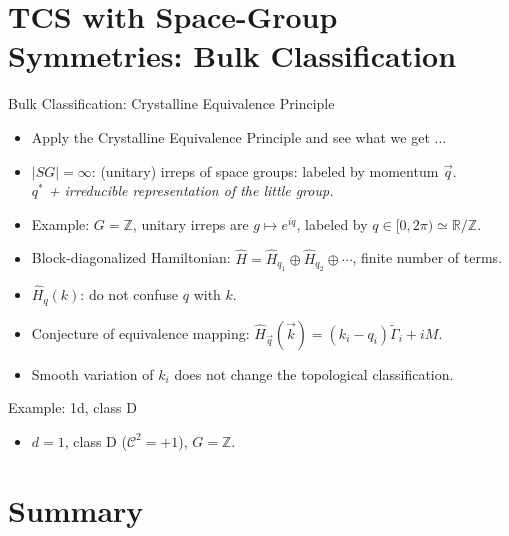 \documentclass[xcolor=table, 11pt, aspectratio=169]{beamer}
\begin{document}
  \section{TCS with Space-Group Symmetries: Bulk Classification}

  \begin{frame}{Bulk Classification: Crystalline Equivalence Principle}
    \begin{itemize}
      \item<1-> Apply the Crystalline Equivalence Principle and see what we get ...
      \item<2-> $|SG|=\infty$: (unitary) irreps of space groups: labeled by momentum $\vec q$.\\
      \emph{$q^\ast$ + irreducible representation of the little group.}
      \item<3-> Example: $G=\mathbb Z$, unitary irreps are $g\mapsto e^{iq}$, labeled by $q\in [0,2\pi)\simeq\mathbb R/\mathbb Z$.
      \item<4-> Block-diagonalized Hamiltonian: $\hat H=\hat H_{q_1}\oplus\hat H_{q_2}\oplus\cdots$, \alert{finite} number of terms.
      \item<5-> $\hat H_q(k)$: do not confuse $q$ with $k$.
      \item<6-> Conjecture of equivalence mapping: $\hat H_{\vec q}(\vec k)=(k_i-q_i)\tilde\Gamma_i+iM$.
      \item<7-> Smooth variation of $k_i$ does not change the topological classification.
    \end{itemize}
    \begin{center}
    \begin{animateinline}{30}
      \multiframe{100}{Ra=1.5+-0.01}{
      \begin{tikzpicture}[scale=2]
          \draw [->] (0, 0) -- (2, 0) node [right] {$k$};
          \draw [blue] (\Ra-0.3, -0.5) -- (\Ra+0.3, 0.5);
          \draw [blue] (\Ra+0.3, -0.5) -- (\Ra-0.3, 0.5);
        \end{tikzpicture}
      }
    \end{animateinline}      
    \end{center}
  \end{frame}

  \begin{frame}{Example: 1d, class D}
    \begin{itemize}
      \item $d=1$, class D ($\mathcal C^2=+1$), $G=\mathbb Z$.
    \end{itemize}
  \end{frame}

  \section{Summary}
\end{document}
